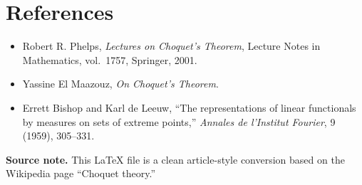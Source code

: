 \documentclass[11pt]{article}
\begin{document}
\section*{References}

\begin{itemize}
    \item Robert R. Phelps, \emph{Lectures on Choquet's Theorem}, Lecture Notes in Mathematics, vol.~1757, Springer, 2001.
    \item Yassine El Maazouz, \emph{On Choquet's Theorem}.
    \item Errett Bishop and Karl de Leeuw, ``The representations of linear functionals by measures on sets of extreme points,'' \emph{Annales de l'Institut Fourier}, 9 (1959), 305--331.
\end{itemize}

\bigskip
\noindent\textbf{Source note.} This \LaTeX{} file is a clean article-style conversion based on the Wikipedia page ``Choquet theory.''
\end{document}
